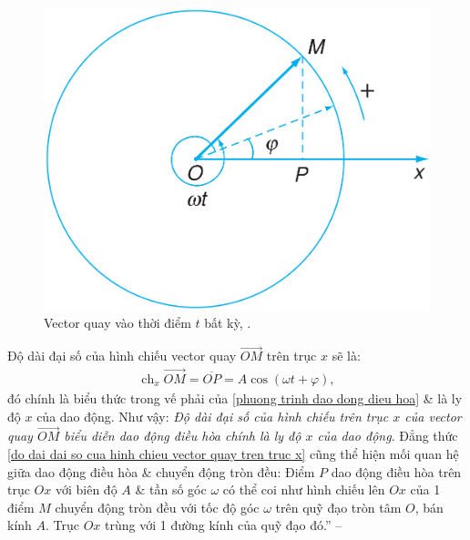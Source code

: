 \documentclass{article}
\numberwithin{equation}{section}
\begin{document}
\begin{figure}[H]
	\centering
	\includegraphics[scale=0.15]{vector_quay_vao_thoi_diem_bat_ky}
	\caption{Vector quay vào thời điểm $t$ bất kỳ, \cite[Hình 6.7, p. 33]{SGK_Vat_Ly_12_nang_cao}.}
	\label{fig:vector_quay_vao_thoi_diem_bat_ky}
\end{figure}
Độ dài đại số của hình chiếu vector quay $\overrightarrow{OM}$ trên trục $x$ sẽ là:
\begin{align}
	\label{do dai dai so cua hinh chieu vector quay tren truc x}
	\operatorname{ch}_x\overrightarrow{OM} = \overline{OP} = A\cos(\omega t + \varphi),
\end{align}
đó chính là biểu thức trong vế phải của \eqref{phuong trinh dao dong dieu hoa} \& là ly độ $x$ của dao động. Như vậy: \textit{Độ dài đại số của hình chiếu trên trục $x$ của vector quay $\overrightarrow{OM}$ biểu diễn dao động điều hòa chính là ly độ $x$ của dao động}. Đẳng thức \eqref{do dai dai so cua hinh chieu vector quay tren truc x} cũng thể hiện mối quan hệ giữa dao động điều hòa \& chuyển động tròn đều: Điểm $P$ dao động điều hòa trên trục $Ox$ với biên độ $A$ \& tần số góc $\omega$ có thể coi như hình chiếu lên $Ox$ của 1 điểm $M$ chuyển động tròn đều với tốc độ góc $\omega$ trên quỹ đạo tròn tâm $O$, bán kính $A$. Trục $Ox$ trùng với 1 đường kính của quỹ đạo đó.'' -- \cite[p. 33]{SGK_Vat_Ly_12_nang_cao}
\end{document}
